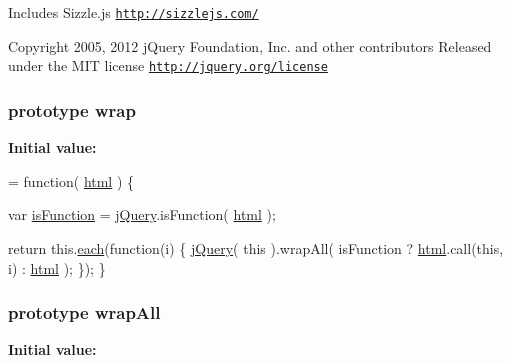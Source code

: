 Includes Sizzle.\-js \href{http://sizzlejs.com/}{\tt http\-://sizzlejs.\-com/}

Copyright 2005, 2012 j\-Query Foundation, Inc. and other contributors Released under the M\-I\-T license \href{http://jquery.org/license}{\tt http\-://jquery.\-org/license} \hypertarget{jquery-1_810_82-vsdoc_8js_a75991b1c3d71522ced1bf65ab3b07902}{
\subsubsection[{wrap}]{ {\bf prototype} wrap}}\label{jquery-1_810_82-vsdoc_8js_a75991b1c3d71522ced1bf65ab3b07902}
{\bfseries Initial value\-:}
\begin{DoxyCode}
= \textcolor{keyword}{function}( \hyperlink{jquery-1_810_82-vsdoc_8js_a54a716632718016dd4e400e83a0970e2}{html} ) \{


        var \hyperlink{jquery-1_810_82-vsdoc_8js_a02aa8413df0c687cbb1cd77943741d5a}{isFunction} = \hyperlink{jquery-1_810_82-vsdoc_8js_add5237586d970a38a81f990e8eb28c6c}{jQuery}.isFunction( \hyperlink{jquery-1_810_82-vsdoc_8js_a54a716632718016dd4e400e83a0970e2}{html} );

        \textcolor{keywordflow}{return} this.\hyperlink{jquery-1_810_82-vsdoc_8js_aae0bcb6b00035445a8f9b262c96ea8a2}{each}(\textcolor{keyword}{function}(i) \{
            \hyperlink{jquery-1_810_82-vsdoc_8js_add5237586d970a38a81f990e8eb28c6c}{jQuery}( \textcolor{keyword}{this} ).wrapAll( isFunction ? \hyperlink{jquery-1_810_82-vsdoc_8js_a54a716632718016dd4e400e83a0970e2}{html}.call(\textcolor{keyword}{this}, i) : 
      \hyperlink{jquery-1_810_82-vsdoc_8js_a54a716632718016dd4e400e83a0970e2}{html} );
        \});
    \}
\end{DoxyCode}
\hypertarget{jquery-1_810_82-vsdoc_8js_a2c353bb2917de8da2978e4b4dd73acb3}{
\subsubsection[{wrap\-All}]{ {\bf prototype} wrap\-All}}\label{jquery-1_810_82-vsdoc_8js_a2c353bb2917de8da2978e4b4dd73acb3}
{\bfseries Initial value\-:}
